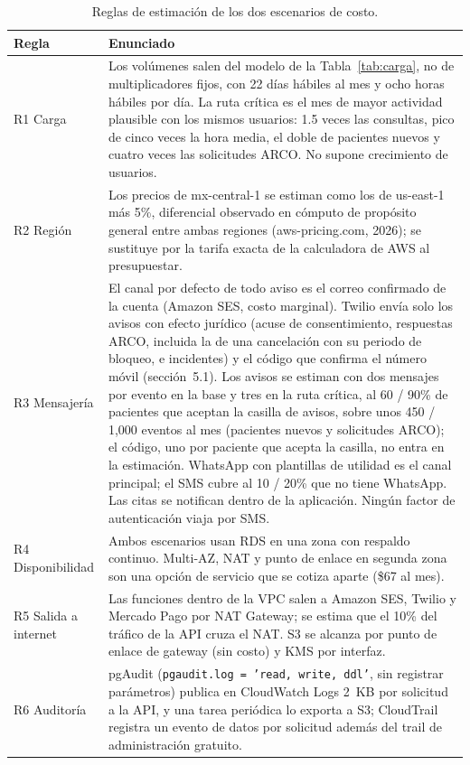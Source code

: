 \documentclass[12pt, a4paper]{article}
\begin{document}
\begin{table}[!ht]
  \centering
  \caption{Reglas de estimación de los dos escenarios de costo.}
  \label{tab:costos-reglas}
  \footnotesize
  \begin{tabularx}{\textwidth}{l X}
    \toprule
    \textbf{Regla} & \textbf{Enunciado} \\
    \midrule
    R1 Carga & Los volúmenes salen del modelo de la Tabla~\ref{tab:carga}, no de multiplicadores fijos, con 22 días hábiles al mes y ocho horas hábiles por día. La ruta crítica es el mes de mayor actividad plausible con los mismos usuarios: 1.5 veces las consultas, pico de cinco veces la hora media, el doble de pacientes nuevos y cuatro veces las solicitudes ARCO. No supone crecimiento de usuarios. \\
    R2 Región & Los precios de mx-central-1 se estiman como los de us-east-1 más 5\%, diferencial observado en cómputo de propósito general entre ambas regiones (aws-pricing.com, 2026); se sustituye por la tarifa exacta de la calculadora de AWS al presupuestar. \\
    R3 Mensajería & El canal por defecto de todo aviso es el correo confirmado de la cuenta (Amazon SES, costo marginal). Twilio envía solo los avisos con efecto jurídico (acuse de consentimiento, respuestas ARCO, incluida la de una cancelación con su periodo de bloqueo, e incidentes) y el código que confirma el número móvil (sección~5.1). Los avisos se estiman con dos mensajes por evento en la base y tres en la ruta crítica, al 60 / 90\% de pacientes que aceptan la casilla de avisos, sobre unos 450 / 1,000 eventos al mes (pacientes nuevos y solicitudes ARCO); el código, uno por paciente que acepta la casilla, no entra en la estimación. WhatsApp con plantillas de utilidad es el canal principal; el SMS cubre al 10 / 20\% que no tiene WhatsApp. Las citas se notifican dentro de la aplicación. Ningún factor de autenticación viaja por SMS. \\
    R4 Disponibilidad & Ambos escenarios usan RDS en una zona con respaldo continuo. Multi-AZ, NAT y punto de enlace en segunda zona son una opción de servicio que se cotiza aparte (\$67 al mes). \\
    R5 Salida a internet & Las funciones dentro de la VPC salen a Amazon SES, Twilio y Mercado Pago por NAT Gateway; se estima que el 10\% del tráfico de la API cruza el NAT. S3 se alcanza por punto de enlace de gateway (sin costo) y KMS por interfaz. \\
    R6 Auditoría & pgAudit (\texttt{pgaudit.log = 'read, write, ddl'}, sin registrar parámetros) publica en CloudWatch Logs 2~KB por solicitud a la API, y una tarea periódica lo exporta a S3; CloudTrail registra un evento de datos por solicitud además del trail de administración gratuito. \\

\end{tabularx}
\end{table}
\end{document}
